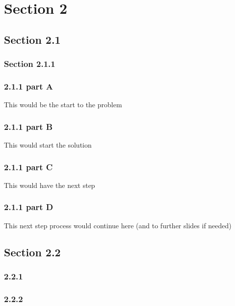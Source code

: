\documentclass[14pt]{beamer}
\begin{document}
\section{Section 2}
\subsection{Section 2.1}
\subsubsection{Section 2.1.1}
\begin{frame}
    \frametitle{2.1.1 part A}
    This would be the start to the problem
\end{frame}
\begin{frame}
    \frametitle{2.1.1 part B}
    This would start the solution
\end{frame}
\begin{frame}
    \frametitle{2.1.1 part C}
    This would have the next step
\end{frame}
\begin{frame}
    \frametitle{2.1.1 part D}
    This next step process would continue here (and to further slides if needed)
\end{frame}

\subsection{Section 2.2}
\begin{frame}
    \frametitle{2.2.1}
\end{frame}
\begin{frame}
    \frametitle{2.2.2}
\end{frame}
\end{document}
